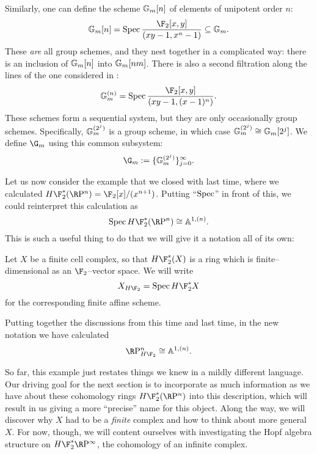 \begin{example}
Similarly, one can define the scheme $\mathbb G_m[n]$ of elements of unipotent order $n$: \[\Gm[n] = \Spec \frac{\F_2[x,y]}{(xy - 1, x^n - 1)} \subseteq \Gm.\]  These \emph{are} all group schemes, and they nest together in a complicated way: there is an inclusion of $\mathbb G_m[n]$ into $\mathbb G_m[nm]$.  There is also a second filtration along the lines of the one considered in : \[\Gm^{(n)} = \Spec \frac{\F_2[x,y]}{(xy - 1, (x - 1)^n)}.\]  These schemes form a sequential system, but they are only occasionally group schemes.  Specifically, $\mathbb G_m^{(2^j)}$ is a group scheme, in which case $\mathbb G_m^{(2^j)} \cong \mathbb G_m[2^j]$.  We define $\G_m$ using this common subsystem: \[\G_m := \{\Gm^{(2^j)}\}_{j=0}^\infty.\]
\end{example}

Let us now consider the example that we closed with last time, where we calculated $H\F_2^*(\RP^n) = \F_2[x] / (x^{n+1})$.  Putting ``$\operatorname{Spec}$'' in front of this, we could reinterpret this calculation as \[\Spec H\F_2^*(\RP^n) \cong \mathbb A^{1, (n)}.\]  This is such a useful thing to do that we will give it a notation all of its own:

\begin{definition}\label{HF2SchemeForFiniteCplx}
Let $X$ be a finite cell complex, so that $H\F_2^*(X)$ is a ring which is finite--dimensional as an $\F_2$--vector space.  We will write \[X_{H\F_2} = \Spec H\F_2^* X\] for the corresponding finite affine scheme.
\end{definition}

\begin{example}
Putting together the discussions from this time and last time, in the new notation we have calculated \[\RP^n_{H\F_2} \cong \mathbb A^{1, (n)}.\]
\end{example}

So far, this example just restates things we knew in a mildly different language.  Our driving goal for the next section is to incorporate as much information as we have about these cohomology rings $H\F_2^* (\RP^n)$ into this description, which will result in us giving a more ``precise'' name for this object.  Along the way, we will discover why $X$ had to be a \emph{finite} complex and how to think about more general $X$.  For now, though, we will content ourselves with investigating the Hopf algebra structure on $H\F_2^* \RP^\infty$, the cohomology of an infinite complex.

